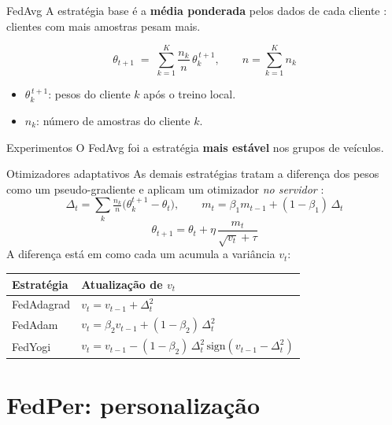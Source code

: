 \documentclass[aspectratio=169,11pt]{beamer}
\begin{document}
\begin{frame}{FedAvg}
  A estratégia base é a \textbf{média ponderada} pelos dados de cada cliente
  \cite{mcmahan2017communication}: clientes com mais amostras pesam mais.

  \[
    \theta_{t+1} \;=\; \sum_{k=1}^{K} \frac{n_k}{n}\, \theta_k^{\,t+1},
    \qquad n = \sum_{k=1}^{K} n_k
  \]

  \begin{itemize}
    \item $\theta_k^{\,t+1}$: pesos do cliente $k$ após o treino local.
    \item $n_k$: número de amostras do cliente $k$.
  \end{itemize}
  \medskip
  \begin{alertblock}{Experimentos}
    O FedAvg foi a estratégia \textbf{mais estável} nos grupos de veículos.
  \end{alertblock}
\end{frame}

\begin{frame}{Otimizadores adaptativos}
  As demais estratégias tratam a diferença dos pesos como um \alert{pseudo-gradiente}
  e aplicam um otimizador \emph{no servidor} \cite{reddi2021adaptive}:
  \[
    \Delta_t = \sum_{k} \tfrac{n_k}{n}\big(\theta_k^{t+1}-\theta_t\big),
    \qquad
    m_t = \beta_1 m_{t-1} + (1-\beta_1)\,\Delta_t
  \]
  \[
    \theta_{t+1} = \theta_t + \eta\,\frac{m_t}{\sqrt{v_t}+\tau}
  \]
  A diferença está em como cada um acumula a variância $v_t$:
  \begin{center}
  \small
  \begin{tabular}{ll}
    \toprule
    \textbf{Estratégia} & \textbf{Atualização de $v_t$} \\
    \midrule
    FedAdagrad & $v_t = v_{t-1} + \Delta_t^2$ \\
    FedAdam    & $v_t = \beta_2 v_{t-1} + (1-\beta_2)\,\Delta_t^2$ \\
    FedYogi    & $v_t = v_{t-1} - (1-\beta_2)\,\Delta_t^2\,\mathrm{sign}(v_{t-1}-\Delta_t^2)$ \\
    \bottomrule
  \end{tabular}
  \end{center}
\end{frame}

\section{FedPer: personalização}
\end{document}
